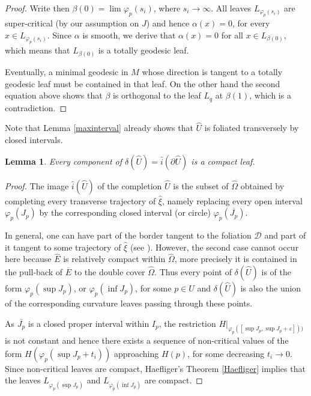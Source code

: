 \documentclass[JEP,XML,SOM,Unicode]{cedram}
\let\mathcal\mathscr
\newtheorem{lemma}[theorem]{Lemma}
\theoremstyle{definition}
\theoremstyle{remark}
\numberwithin{equation}{section}
\begin{document}
\begin{proof}
Write then $\beta(0)=\lim \varphi_p(s_i)$, where $s_i\to \infty$.
All leaves $L_{\varphi_p(s_i)}$ are super-critical (by our assumption on $J$) and hence
$\alpha(x)=0$, for every $x\in L_{\varphi_p(s_i)}$. Since $\alpha$ is smooth, we derive that
$\alpha(x)=0$ for all $x\in L_{\beta(0)}$, which means that $L_{\beta(0)}$ is a totally geodesic leaf.

Eventually, a minimal geodesic in $M$ whose direction is tangent to a totally geodesic
leaf must be contained in that leaf. On the other hand the second equation
above shows that $\beta$ is orthogonal to the leaf $L_q$ at $\beta(1)$, which is
a contradiction.
\end{proof}

Note that Lemma \ref{maxinterval} already shows that $\wideparen{U}$ is foliated transversely by closed intervals.

\begin{lemma}\label{border}
Every component of $\delta(\wideparen{U})=\wideparen{i}(\partial \wideparen{U})$ is a compact leaf.
\end{lemma}
\begin{proof}
The image $\wideparen{i}(\wideparen{U})$ of the completion $\wideparen{U}$ is the subset of $\widehat{\Omega}$ obtained
by completing every transverse trajectory of $\widehat{\xi}$, namely replacing every open interval $\varphi_p(J_p)$ by the corresponding closed
interval (or circle) $\varphi_p(\overline{J_p})$.

In general, one can have part of the border tangent to the foliation $\mathcal D$ and part of it
tangent to some trajectory of $\widehat{\xi}$ (see \cite[\S4]{CaC}). However, the second case cannot occur here
because $\widehat{E}$ is relatively compact within $\widehat{\Omega}$, more precisely it is
contained in the pull-back of $\overline{E}$ to the double cover $\widehat{\Omega}$.
Thus every point of $\delta(\wideparen{U})$ is of the form $\varphi_p(\sup J_p)$, or $\varphi_p(\inf J_p)$, for some $p\in U$ and
$\delta(\wideparen{U})$ is also the union of the corresponding curvature leaves passing through these points.

As $\overline{J_p}$ is a closed proper interval within $I_p$, the restriction $H|_{\varphi_p([\sup J_p, \sup J_p+\varepsilon]))}$
is not constant and hence there exists a sequence of
non-critical values of the form $H(\varphi_p(\sup J_p+t_i))$ approaching $H(p)$,
for some decreasing $t_i\to 0$.
Since non-critical leaves are compact, Haefliger's Theorem \ref{Haefliger} implies
that the leaves $L_{\varphi_p(\sup J_p)}$ and $L_{\varphi_p(\inf J_p)}$ are compact.
\end{proof}
\end{document}
